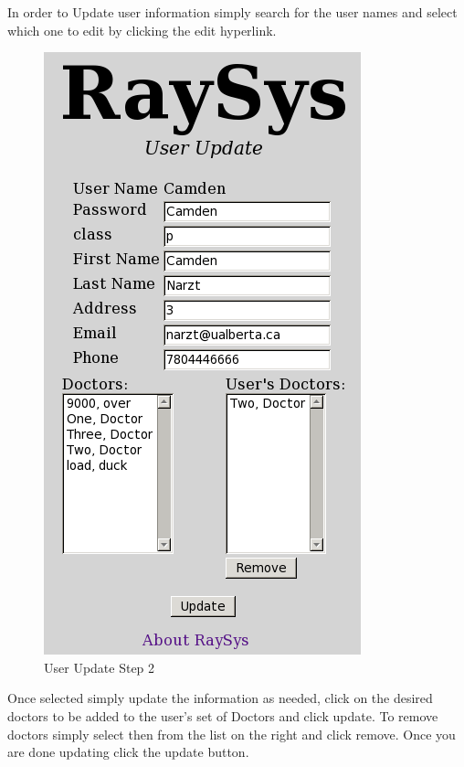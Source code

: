 \documentclass[11pt]{report}
\begin{document}
In order to Update user information simply search for the user names and select which one to edit by clicking the edit hyperlink.

\begin{figure}[htb]
  \begin{center}
    \includegraphics[scale=0.60]{imgs/us2.png}
    \caption{User Update Step 2}
    \label{fig:us2}
  \end{center}
\end{figure}

Once selected simply update the information as needed, click on the desired doctors to be added to the user's set of Doctors and click update. To remove doctors simply select then from the list on the right and click remove. Once you are done updating click the update button.
\end{document}
